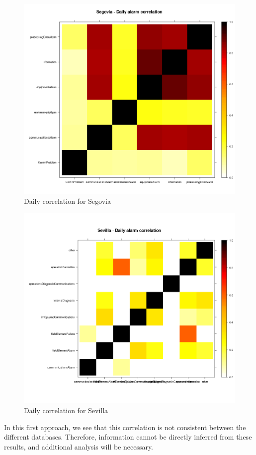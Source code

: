 \documentclass[a4paper,10pt]{book}
\begin{document}
\begin{figure}[h!]
 \centering
 \includegraphics[height=0.4\textheight]{./img/segovia_correlation.png}
 \caption{Daily correlation for Segovia}
 \label{fig:segovia}
\end{figure}
\begin{figure}[h!]
 \centering
 \includegraphics[height=0.4\textheight]{./img/sevilla_correlation.png}
 \caption{Daily correlation for Sevilla}
 \label{fig:sevilla}
\end{figure}

\clearpage

In this first approach, we see that this correlation is not consistent between the different databases. Therefore, information cannot be directly inferred from these results, and additional analysis will be necessary.
\end{document}

